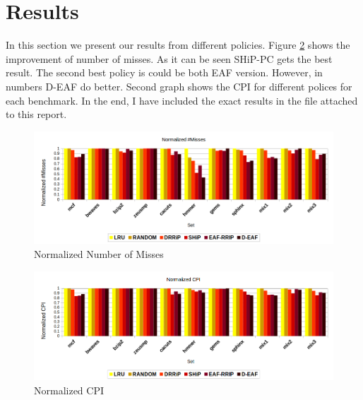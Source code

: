 \documentclass{article}
\begin{document}
\section{Results} \label{results}
In this section we present our results from different policies. Figure \ref{misses} shows the improvement of number of misses. As it can be seen SHiP-PC gets the best result. The second best policy is could be both EAF version. However, in numbers D-EAF do better. Second graph shows the CPI for different polices for each benchmark. In the end, I have included the exact results in the file attached to this report.

\begin{figure}[h!]
  \label{misses}
  \centering
    \includegraphics[width=1.0\textwidth]{grap1.png}
    \caption{Normalized Number of Misses}
\end{figure}

\begin{figure}[h!]
  \label{misses}
  \centering
    \includegraphics[width=1.0\textwidth]{grap2.png}
    \caption{Normalized CPI}
\end{figure}

\clearpage



\end{document}
